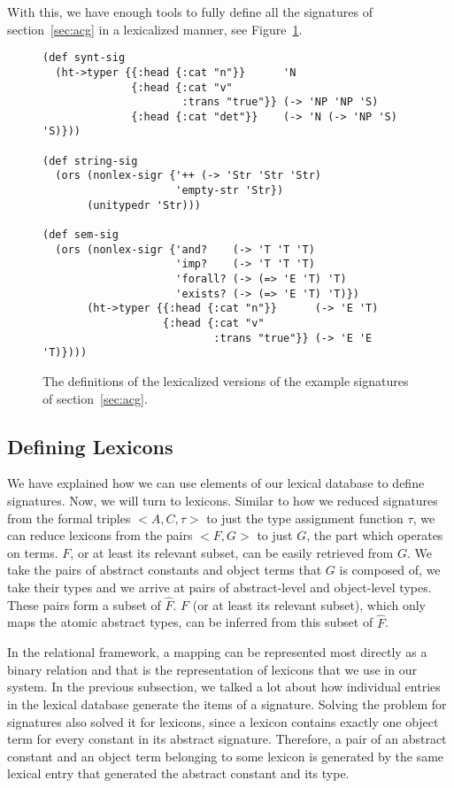 With this, we have enough tools to fully define all the signatures of
section~\ref{sec:acg} in a lexicalized manner, see
Figure~\ref{fig:example-sig-impl}.

\begin{figure}
  \centering
\begin{verbatim}
(def synt-sig
  (ht->typer {{:head {:cat "n"}}      'N
              {:head {:cat "v"
                      :trans "true"}} (-> 'NP 'NP 'S)
              {:head {:cat "det"}}    (-> 'N (-> 'NP 'S) 'S)}))

(def string-sig
  (ors (nonlex-sigr {'++ (-> 'Str 'Str 'Str)
                     'empty-str 'Str})
       (unitypedr 'Str)))

(def sem-sig
  (ors (nonlex-sigr {'and?    (-> 'T 'T 'T)
                     'imp?    (-> 'T 'T 'T)
                     'forall? (-> (=> 'E 'T) 'T)
                     'exists? (-> (=> 'E 'T) 'T)})
       (ht->typer {{:head {:cat "n"}}      (-> 'E 'T)
                   {:head {:cat "v"
                           :trans "true"}} (-> 'E 'E 'T)})))
\end{verbatim}
  \caption{\label{fig:example-sig-impl} The definitions of the
    lexicalized versions of the example signatures of
    section~\ref{sec:acg}.}
\end{figure}


\subsection{Defining Lexicons}
\label{ssec:def-lex}

We have explained how we can use elements of our lexical database to
define signatures. Now, we will turn to lexicons. Similar to how we
reduced signatures from the formal triples $\mathopen{<}A, C,
\tau\mathclose{>}$ to just the type assignment function $\tau$, we can
reduce lexicons from the pairs $\mathopen{<}F, G\mathclose{>}$ to just
$G$, the part which operates on terms. $F$, or at least its relevant
subset, can be easily retrieved from $G$. We take the pairs of abstract
constants and object terms that $G$ is composed of, we take their types
and we arrive at pairs of abstract-level and object-level types. These
pairs form a subset of $\hat{F}$. $F$ (or at least its relevant subset),
which only maps the atomic abstract types, can be inferred from this
subset of $\hat{F}$.

In the relational framework, a mapping can be represented most directly
as a binary relation and that is the representation of lexicons that we
use in our system. In the previous subsection, we talked a lot about how
individual entries in the lexical database generate the items of a
signature. Solving the problem for signatures also solved it for
lexicons, since a lexicon contains exactly one object term for every
constant in its abstract signature. Therefore, a pair of an abstract
constant and an object term belonging to some lexicon is generated by
the same lexical entry that generated the abstract constant and its
type.

